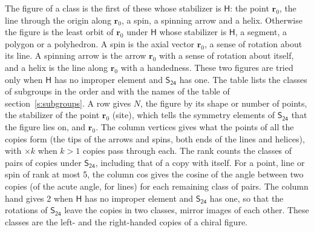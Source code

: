 \documentclass[10pt,a4paper]{article}
\numberwithin{equation}{section}
\newcommand{\grp}[1]{\mathsf{#1}}
\newcommand{\pointr}{\mathbf{r}}
\begin{document}
\leavevmode\label{n:head.figure}The figure of a class is the first of these whose stabilizer is $\grp{H}$: the point $\pointr_0$, the line through the origin along $\pointr_0$, a spin, a spinning arrow and a helix. Otherwise the figure is the least orbit of $\pointr_0$ under $\grp{H}$ whose stabilizer is $\grp{H}$, a segment, a polygon or a polyhedron. A spin is the axial vector $\pointr_0$, a sense of rotation about its line. A spinning arrow is the arrow $\pointr_0$ with a sense of rotation about itself, and a helix is the line along $\pointr_0$ with a handedness. These two figures are tried only when $\grp{H}$ has no improper element and $\grp{S_{24}}$ has one. The table lists the classes of subgroups in the order and with the names of the table of section~\ref{s:subgroups}. \label{n:head.site}A row gives $N$, the figure by its shape or number of points, the stabilizer of the point $\pointr_0$ (site), which tells the symmetry elements of $\grp{S_{24}}$ that the figure lies on, and $\pointr_0$. \label{n:head.vertices}The column vertices gives what the points of all the copies form (the tips of the arrows and spins, both ends of the lines and helices), with ${\times}k$ when $k > 1$ copies pass through each. \label{n:head.rank}The rank counts the classes of pairs of copies under $\grp{S_{24}}$, including that of a copy with itself. \label{n:head.cos}For a point, line or spin of rank at most 5, the column cos gives the cosine of the angle between two copies (of the acute angle, for lines) for each remaining class of pairs. \label{n:head.hand}The column hand gives 2 when $\grp{H}$ has no improper element and $\grp{S_{24}}$ has one, so that the rotations of $\grp{S_{24}}$ leave the copies in two classes, mirror images of each other. These classes are the left- and the right-handed copies of a chiral figure.
\end{document}
